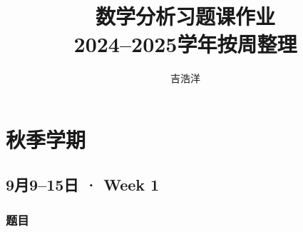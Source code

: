 \documentclass[UTF8,11pt, a4paper, oneside, fontset=none]{ctexbook}
\title{数学分析习题课作业\\2024--2025学年按周整理}
\author{吉浩洋}
\date{}
\begin{document}
\maketitle

\tableofcontents

\clearpage

\chapter{秋季学期}

\clearpage

\section{9月9--15日 · Week 1}

\subsection*{题目}
\end{document}
